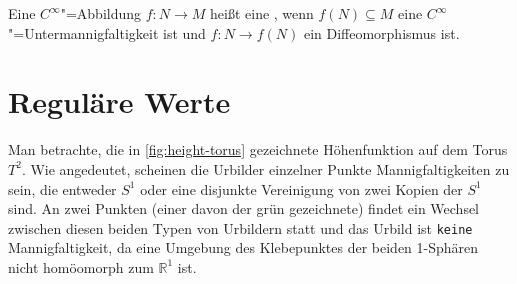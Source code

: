 \begin{definition}[{name=[Einbettung]}]
	Eine $C^\infty$"=Abbildung $f \colon N \to M$ heißt eine , wenn $f(N) \subseteq M$ eine $C^\infty$"=Untermannigfaltigkeit ist und $f \colon N \to f(N)$ ein Diffeomorphismus ist. 
\end{definition}

\newpage
\section{Reguläre Werte} %
\label{sec:regulare_werte}

Man betrachte, die in \cref{fig:height-torus} gezeichnete Höhenfunktion auf dem Torus $T^2$.
Wie angedeutet, scheinen die Urbilder einzelner Punkte Mannigfaltigkeiten zu sein, die entweder $S^1$ oder eine disjunkte Vereinigung von zwei Kopien der $S^1$ sind.
An zwei Punkten (einer davon der grün gezeichnete) findet ein Wechsel zwischen diesen beiden Typen von Urbildern statt und das Urbild ist \texttt{keine} Mannigfaltigkeit, da eine Umgebung des Klebepunktes der beiden 1-Sphären nicht homöomorph zum $\mathbb{R}^1$ ist.
